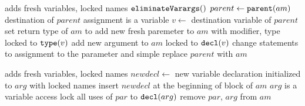 \begin{algorithm}[p]
\caption{$\refactoring{Introduce Out Parameter}(am \colon \type{AnonymousMethod})$}
\label{alg:IntroduceOutParameter}
\begin{algorithmic}[1]
\REQUIRE
\ENSURE adds fresh variables, locked names
\medskip
  \STATE $\text{\texttt{eliminateVarargs}}()$
  \STATE $parent \leftarrow \text{\texttt{parent}}(am)$
    \STATE \assert destination of $parent$ assignment is a variable
    \STATE $v \leftarrow $ destination variable of $parent$
    \STATE set return type of $am$ to 
    \STATE add new fresh paremeter to $am$ with  modifier, type locked to $\text{\texttt{type}}(v)$
    \STATE add new argument to $am$ locked to $\text{\texttt{decl}}(v)$
    \STATE change  statements to assignment to the parameter and simple 
    \STATE replace $parent$ with $am$
  \ENDIF
\end{algorithmic}
\end{algorithm}


\begin{algorithm}[p]
\caption{$\refactoring{Open Variables}(am \colon \type{AnonymousMethod})$}
\label{alg:OpenVariables}
\begin{algorithmic}[1]
\REQUIRE 
\ENSURE adds fresh variables, locked names 
\medskip
      \STATE $newdecl \leftarrow$ new variable declaration initialized to $arg$ with locked names
      \STATE insert $newdecl$ at the beginning of block of $am$
      \STATE \assert $arg$ is a variable access
      \STATE lock all uses of $par$ to $\text{\texttt{decl}}(arg)$
    \ENDIF
    \STATE remove $par$, $arg$ from $am$
  \ENDFOR
\end{algorithmic}
\end{algorithm}


